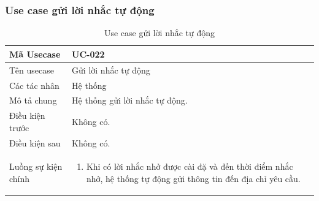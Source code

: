 \documentclass[12pt,a4paper]{article}
\begin{document}
    \subsubsection*{Use case gửi lời nhắc tự động}
    \begin{table}[H]
        \centering
        \begin{tabular}{|p{3.5cm}|p{11.5cm}|c|}
            \hline
            Mã Usecase      & UC-022                         \\
            \hline
            Tên usecase     & Gửi lời nhắc tự động           \\
            \hline
            Các tác nhân    & Hệ thống                       \\
            \hline
            Mô tả chung     & Hệ thống gửi lời nhắc tự động. \\
            \hline

            Điều kiện trước & Không có.                      \\
            \hline

            Điều kiện sau   & Không có.                      \\
            \hline

            Luồng sự kiện chính & \vspace{-.8cm}\begin{enumerate}
                                                    \item Khi có lời nhắc nhở được cài đặ và đến thời điểm nhắc nhở, hệ thống tự động gửi thông tin đến địa chỉ yêu cầu.
            \end{enumerate}
            \\
            \hline
        \end{tabular}
        \caption{Use case gửi lời nhắc tự động}

    \end{table}


\end{document}
